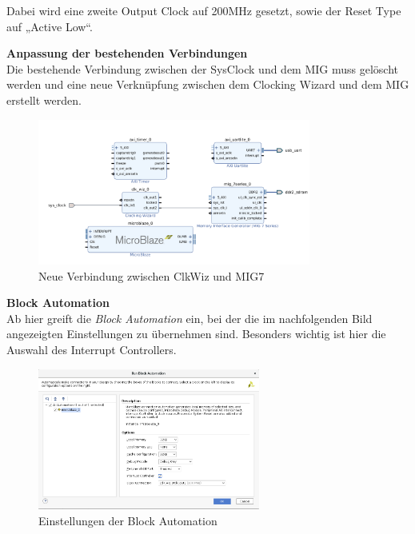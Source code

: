 \vspace{10mm}

Dabei wird eine zweite Output Clock auf 200MHz gesetzt, sowie der Reset Type auf „Active Low“.\\

\newpage

\textbf{Anpassung der bestehenden Verbindungen}\\

Die bestehende Verbindung zwischen der SysClock und dem MIG muss gelöscht werden und eine neue Verknüpfung zwischen dem Clocking Wizard und dem MIG erstellt werden.\\

\begin{figure}[H]
\centering
\includegraphics[width=0.8\textwidth]{Hauptteil/schritt6.png}
\caption{Neue Verbindung zwischen ClkWiz und MIG7}\label{fig:mbschritt6}
\end{figure}

\vspace{10mm}

\textbf{Block Automation}\\

Ab hier greift die \emph{Block Automation} ein, bei der die im nachfolgenden Bild angezeigten Einstellungen zu übernehmen sind.
Besonders wichtig ist hier die Auswahl des Interrupt Controllers.

\begin{figure}[H]
\centering
\includegraphics[width=0.65\textwidth]{Hauptteil/schritt7.png}
\caption{Einstellungen der Block Automation}\label{fig:mbschritt7}
\end{figure}


